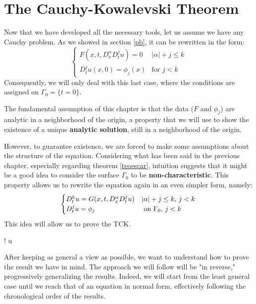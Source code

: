 \chapter{The Cauchy-Kowalevski Theorem} \label{invariant}

Now that we have developed all the necessary tools, let us assume we have any Cauchy problem. As we showed in section \ref{pb}, it can be rewritten in the form:
$$
\begin{cases}
F(x,t, D^\alpha_x D^j_t u)=0 & |\alpha | +j \leq k\\
D^j_t u (x,0)= \phi_j(x) & \text{for }j<k 
\end{cases}
$$
Consequently, we will only deal with this last case, where the conditions are assigned on $\Gamma_0=\{ t=0 \}$.

The fundamental assumption of this chapter is that the data ($F$ and $\phi_j$) are analytic in a neighborhood of the origin, a property that we will use to show the existence of a unique \textbf{analytic solution}, still in a neighborhood of the origin.

However, to guarantee existence, we are forced to make some assumptions about the structure of the equation. 
Considering what has been said in the previous chapter, especially regarding theorem \ref{teoescar}, intuition suggests that it might be a good idea to consider the surface $\Gamma_0$ to be \textbf{non-characteristic}. 
This property allows us to rewrite the equation again in an even simpler form, namely:
\begin{equation}\label{pbnorm}
\begin{cases}
D_{t}^k u = G(x,t, D^\alpha_x D^j_t u) & |\alpha |+ j \leq k, \, j<k \\ 
D_t^ju = \phi_j & \text{ on } \Gamma_0, \, j<k
\end{cases} \\ 
\end{equation}
This idea will allow us to prove the TCK.
\begin{namedtheorem}
{\exists ! \; u }
\end{namedtheorem}


After keeping as general a view as possible, we want to understand how to prove the result we have in mind. The approach we will follow will be "in reverse," progressively generalizing the results. Indeed, we will start from the least general case until we reach that of an equation in normal form, effectively following the chronological order of the results.


